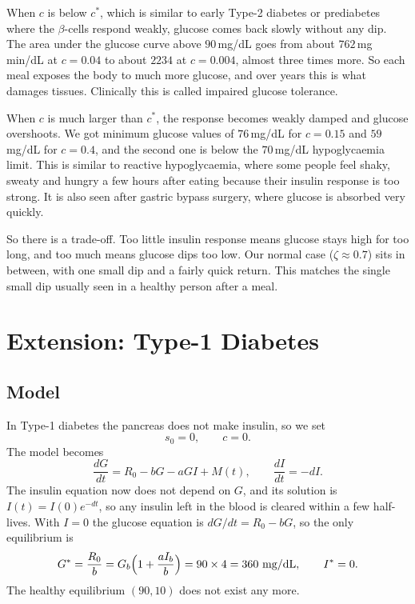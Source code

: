 \documentclass[11pt,a4paper]{article}
\newcommand{\Gb}{G_b}
\newcommand{\Ib}{I_b}
\newcommand{\cs}{c^{*}}
\begin{document}
When $c$ is below $\cs$, which is similar to early Type-2 diabetes or prediabetes where the $\beta$-cells respond weakly, glucose comes back slowly without any dip. The area under the glucose curve above $90$\,mg/dL goes from about $762$\,mg\,min/dL at $c=0.04$ to about $2234$ at $c=0.004$, almost three times more. So each meal exposes the body to much more glucose, and over years this is what damages tissues. Clinically this is called impaired glucose tolerance.

When $c$ is much larger than $\cs$, the response becomes weakly damped and glucose overshoots. We got minimum glucose values of $76$\,mg/dL for $c=0.15$ and $59$\,mg/dL for $c=0.4$, and the second one is below the $70$\,mg/dL hypoglycaemia limit. This is similar to reactive hypoglycaemia, where some people feel shaky, sweaty and hungry a few hours after eating because their insulin response is too strong. It is also seen after gastric bypass surgery, where glucose is absorbed very quickly.

So there is a trade-off. Too little insulin response means glucose stays high for too long, and too much means glucose dips too low. Our normal case ($\zeta\approx0.7$) sits in between, with one small dip and a fairly quick return. This matches the single small dip usually seen in a healthy person after a meal.

\section{Extension: Type-1 Diabetes}\label{sec:type1}

\subsection{Model}
In Type-1 diabetes the pancreas does not make insulin, so we set
\begin{equation}
s_0=0,\qquad c=0 .
\end{equation}
The model becomes
\begin{equation}\label{eq:type1}
\frac{dG}{dt}=R_0-bG-aGI+M(t),\qquad \frac{dI}{dt}=-dI .
\end{equation}
The insulin equation now does not depend on $G$, and its solution is $I(t)=I(0)e^{-dt}$, so any insulin left in the blood is cleared within a few half-lives. With $I=0$ the glucose equation is $dG/dt=R_0-bG$, so the only equilibrium is
\begin{equation}
G^{*}=\frac{R_0}{b}=\Gb\Bigl(1+\frac{a\Ib}{b}\Bigr)=90\times4=360\ \text{mg/dL},\qquad I^*=0 .
\end{equation}
The healthy equilibrium $(90,10)$ does not exist any more.
\end{document}
